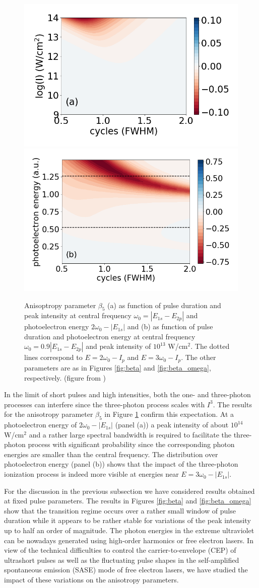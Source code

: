 \begin{figure}[!ht]
\centering
\includegraphics[width=0.4\linewidth]{figs/Photo_ionization/short_pulse/beta_5_heat.png}
\includegraphics[width=0.4\linewidth]{figs/Photo_ionization/short_pulse/energy_d0p9_beta_5_I_2_heat.png}\\
\caption{
Anisoptropy parameter $\beta_5$ (a) as function of pulse duration and peak intensity at central frequency $\omega_0 = |E_{1s}-E_{2p}|$ and photoelectron energy $2\omega_0 - |E_{1s}|$ and (b) as function of pulse duration and photoelectron energy at central frequency $\omega_0 = 0.9|E_{1s}-E_{2p}|$ and peak intensity of $10^{13}$ W/cm$^2$. The dotted lines correspond to $E = 2\omega_0 - I_p$ and $E = 3\omega_0 - I_p$. The other parameters are as in Figures \ref{fig:beta} and \ref{fig:beta_omega}, respectively. (figure from \cite{venzke2020_ionization})
} 
  \label{fig:beta-3w}
\end{figure}

In the limit of short pulses and high intensities, both the one- and three-photon processes can interfere since the three-photon process scales with $I^3$. The results for the anisotropy parameter $\beta_5$ in Figure \ref{fig:beta-3w} confirm this expectation. At a photoelectron energy of $2\omega_0 - |E_{1s}|$ (panel (a)) a peak intensity of about $10^{14}$ W/cm$^2$ and a rather large spectral bandwidth is required to facilitate the three-photon process with significant probability since the corresponding photon energies are smaller than the central frequency. The distribution over photoelectron energy (panel (b)) shows that the impact of the three-photon ionization process is indeed more visible at energies near $E = 3\omega_0 - |E_{1s}|$.


For the discussion in the previous subsection we have considered results obtained at fixed pulse parameters. The results in Figures \ref{fig:beta} and \ref{fig:beta_omega} show that the transition regime occurs over a rather small window of pulse duration while it appears to be rather stable for variations of the peak intensity up to half an order of magnitude. The photon energies in the extreme ultraviolet can be nowadays generated using high-order harmonics or free electron lasers. In view of the technical difficulties to control the carrier-to-envelope (CEP) of ultrashort pulses as well as the fluctuating pulse shapes in the self-amplified spontaneous emission (SASE) mode of free electron lasers, we have studied the impact of these variations on the anisotropy parameters. 

